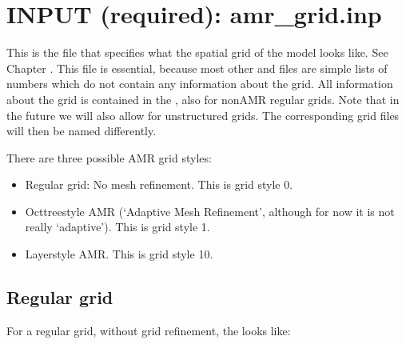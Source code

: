 \documentclass[letterpaper,10pt,english]{sphinxmanual}
\begin{document}
\section{INPUT (required): amr\_grid.inp}
\label{\detokenize{inputoutputfiles:input-required-amr-grid-inp}}\label{\detokenize{inputoutputfiles:sec-grid-input}}
This is the file that specifies what the spatial grid of the model looks
like. See Chapter {\hyperref[\detokenize{gridding:chap-gridding}]{}}. This file is essential, because most
other  and  files are simple lists of numbers which do not
contain any information about the grid. All information about the grid is
contained in the , also for non\sphinxhyphen{}AMR regular grids. Note that
in the future we will also allow for unstructured grids. The corresponding grid
files will then be named differently.

There are three possible AMR grid styles:
\begin{itemize}
\item {} 
Regular grid: No mesh refinement. This is grid style 0.

\item {} 
Oct\sphinxhyphen{}tree\sphinxhyphen{}style AMR (‘Adaptive Mesh Refinement’, although for now it
is not really ‘adaptive’). This is grid style 1.

\item {} 
Layer\sphinxhyphen{}style AMR. This is grid style 10.

\end{itemize}


\subsection{Regular grid}
\label{\detokenize{inputoutputfiles:regular-grid}}\label{\detokenize{inputoutputfiles:sec-amr-grid-regular}}
For a regular grid, without grid refinement, the  looks like:
\end{document}
